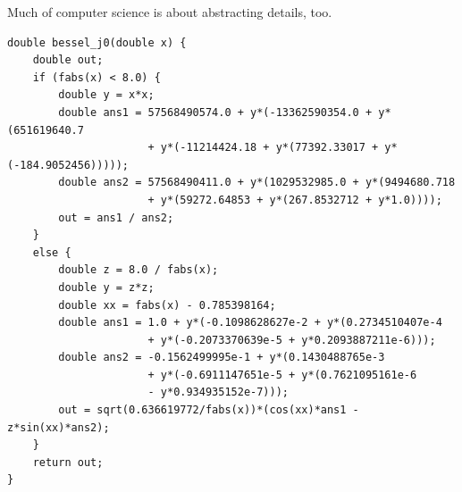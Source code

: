 \documentclass[aspectratio=169]{beamer}
\begin{document}
\begin{frame}[fragile]{Much of computer science is about abstracting details, too.}
\scriptsize
\vspace{0.05 cm}
\begin{verbatim}
double bessel_j0(double x) {
    double out;
    if (fabs(x) < 8.0) {
        double y = x*x;
        double ans1 = 57568490574.0 + y*(-13362590354.0 + y*(651619640.7
                      + y*(-11214424.18 + y*(77392.33017 + y*(-184.9052456)))));
        double ans2 = 57568490411.0 + y*(1029532985.0 + y*(9494680.718
                      + y*(59272.64853 + y*(267.8532712 + y*1.0))));
        out = ans1 / ans2;
    }
    else {
        double z = 8.0 / fabs(x);
        double y = z*z;
        double xx = fabs(x) - 0.785398164;
        double ans1 = 1.0 + y*(-0.1098628627e-2 + y*(0.2734510407e-4
                      + y*(-0.2073370639e-5 + y*0.2093887211e-6)));
        double ans2 = -0.1562499995e-1 + y*(0.1430488765e-3
                      + y*(-0.6911147651e-5 + y*(0.7621095161e-6
                      - y*0.934935152e-7)));
        out = sqrt(0.636619772/fabs(x))*(cos(xx)*ans1 - z*sin(xx)*ans2);
    }
    return out;
}
\end{verbatim}

\vspace{-7.95 cm}

\vspace{6.4 cm}

\end{frame}
\end{document}
